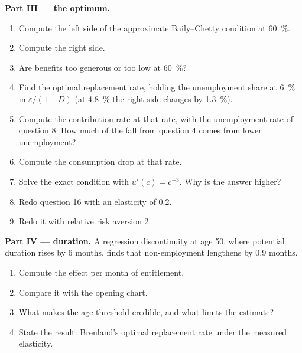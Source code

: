 \begin{problem}
\medskip\noindent\textbf{Part III --- the optimum.}
\begin{enumerate}[resume]
\item Compute the left side of the approximate Baily--Chetty condition at 60~\%.
\item Compute the right side.
\item Are benefits too generous or too low at 60~\%?
\item Find the optimal replacement rate, holding the unemployment share at 6~\% in
$\varepsilon/(1 - D)$ (at 4.8~\% the right side changes by 1.3~\%).
\item Compute the contribution rate at that rate, with the unemployment rate of
question 8. How much of the fall from question 4 comes from lower unemployment?
\item Compute the consumption drop at that rate.
\item Solve the exact condition with $u'(c) = c^{-3}$. Why is the answer higher?
\item Redo question 16 with an elasticity of 0.2.
\item Redo it with relative risk aversion 2.
\end{enumerate}

\medskip\noindent\textbf{Part IV --- duration.} A regression discontinuity at age 50,
where potential duration rises by 6 months, finds that non-employment lengthens by
0.9 months.
\begin{enumerate}[resume]
\item Compute the effect per month of entitlement.
\item Compare it with the opening chart.
\item What makes the age threshold credible, and what limits the estimate?
\item State the result: Brenland's optimal replacement rate under the measured
elasticity.
\end{enumerate}
\end{problem}
